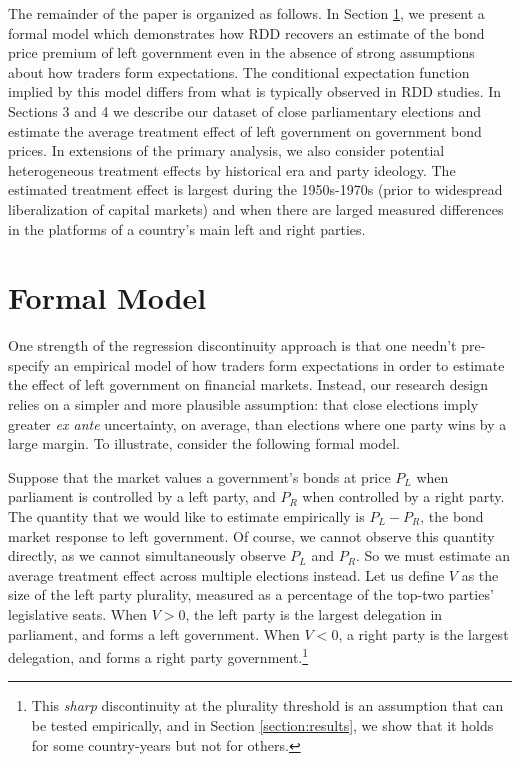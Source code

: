 \documentclass[12pt]{article}
\begin{document}
The remainder of the paper is organized as follows. In Section \ref{section:formal_model}, we present a formal model which demonstrates how RDD recovers an estimate of the bond price premium of left government even in the absence of strong assumptions about how traders form expectations. The conditional expectation function implied by this model differs from what is typically observed in RDD studies. In Sections 3 and 4 we describe our dataset of close parliamentary elections and estimate the average treatment effect of left government on government bond prices. In extensions of the primary analysis, we also consider potential heterogeneous treatment effects by historical era and party ideology. The estimated treatment effect is largest during the 1950s-1970s (prior to widespread liberalization of capital markets) and when there are larged measured differences in the platforms of a country's main left and right parties.



\section{Formal Model} \label{section:formal_model}

One strength of the regression discontinuity approach is that one needn't pre-specify an empirical model of how traders form expectations in order to estimate the effect of left government on financial markets. Instead, our research design relies on a simpler and more plausible assumption: that close elections imply greater \textit{ex ante} uncertainty, on average, than elections where one party wins by a large margin. To illustrate, consider the following formal model.

Suppose that the market values a government's bonds at price $P_L$ when parliament is controlled by a left party, and $P_R$ when controlled by a right party. The quantity that we would like to estimate empirically is $P_L - P_R$, the bond market response to left government. Of course, we cannot observe this quantity directly, as we cannot simultaneously observe $P_L$ and $P_R$. So we must estimate an average treatment effect across multiple elections instead. Let us define $V$ as the size of the left party plurality, measured as a percentage of the top-two parties' legislative seats. When $V > 0$, the left party is the largest delegation in parliament, and forms a left government. When $V < 0$, a right party is the largest delegation, and forms a right party government.\footnote{This \textit{sharp} discontinuity at the plurality threshold is an assumption that can be tested empirically, and in Section \ref{section:results}, we show that it holds for some country-years but not for others.}
\end{document}
